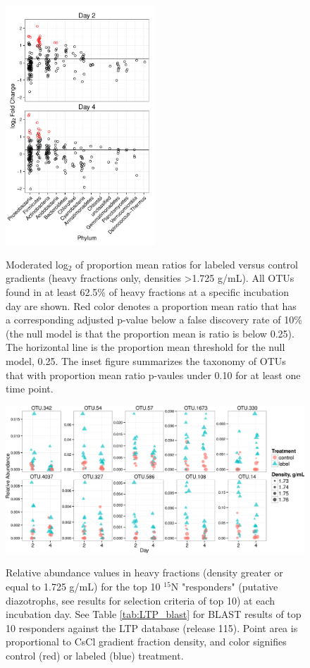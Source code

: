 \begin{figure}[H]
  \centering
  \caption{Moderated log$_{2}$ of proportion mean ratios for labeled versus control gradients (heavy fractions only, densities >1.725 g/mL). All OTUs found in at least 62.5\% of heavy fractions at a specific incubation day are shown. Red color denotes a proportion mean ratio that has a corresponding adjusted p-value below a false discovery rate of 10\% (the null model is that the proportion mean is ratio is below 0.25). The horizontal line is the proportion mean threshold for the null model, 0.25. The inset figure summarizes the taxonomy of OTUs that with proportion mean ratio p-vaules under 0.10 for at least one time point.}
    \includegraphics[width=0.5\textwidth]{figures/l2fc/l2fc.pdf}
  \label{fig:l2fc}
\end{figure}

\begin{figure}[H]
  \centering
    \caption{Relative abundance values in heavy fractions (density greater or equal to 1.725 g/mL) for the top 10 $^{15}$N "responders" (putative diazotrophs, see results for selection criteria of top 10) at each incubation day. See Table \ref{tab:LTP_blast} for BLAST results of top 10 responders against the LTP database (release 115). Point area is proportional to CsCl gradient fraction density, and color signifies control (red) or labeled (blue) treatment.}
    \includegraphics[width=1.0\textwidth]{figures/scatter_heavy_topN2/scatter_heavy_topN.png}
  \label{fig:scatter_heavy}
\end{figure}

